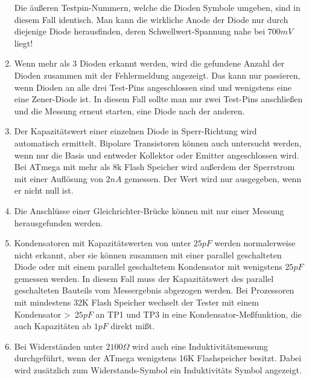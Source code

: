 \begin{enumerate}
Die äußeren Testpin-Nummern, welche die Dioden Symbole umgeben, sind in diesem Fall identisch.
Man kann die wirkliche Anode der Diode nur durch diejenige Diode herausfinden, deren Schwellwert-Spannung nahe bei \(700mV\) liegt!
\item Wenn mehr als 3 Dioden erkannt werden, wird die gefundene Anzahl der Dioden zusammen mit der Fehlermeldung angezeigt.
Das kann nur passieren, wenn Dioden an alle drei Test-Pins angeschlossen sind und wenigstens eine eine Zener-Diode ist.
In diesem Fall sollte man nur zwei Test-Pins anschließen und die Messung erneut starten, eine Diode nach der anderen.
\item Der Kapazitätswert einer einzelnen Diode in Sperr-Richtung wird automatisch ermittelt.
Bipolare Transistoren können auch untersucht werden, wenn nur die Basis und entweder Kollektor oder Emitter angeschlossen wird.
Bei ATmega mit mehr als 8k Flash Speicher wird außerdem der Sperrstrom mit einer Auflösung von \(2nA\) gemessen.
Der Wert wird nur ausgegeben, wenn er nicht null ist.
\item Die Anschlüsse einer Gleichrichter-Brücke können mit nur einer Messung herausgefunden werden.
\item Kondensatoren mit Kapazitätswerten von unter \(25pF\) werden normalerweise nicht erkannt, 
aber sie können zusammen mit einer parallel geschalteten Diode oder mit einem parallel geschaltetem Kondensator mit
wenigstens \(25pF\) gemessen werden.
In diesem Fall muss der Kapazitätswert des parallel geschalteten Bauteils vom Messergebnis abgezogen werden.
Bei Prozessoren mit mindestens 32K Flash Speicher wechselt der Tester mit einem Kondensator \textgreater~\(25pF\)
an TP1 und TP3 in eine Kondensator-Meßfunktion, die auch Kapazitäten ab \(1pF\) direkt mißt.
\item Bei Widerständen unter \(2100\Omega\) wird auch eine Induktivitätsmessung durchgeführt, wenn der
ATmega wenigstens 16K Flashspeicher besitzt.
Dabei wird zusätzlich zum Widerstands-Symbol \mbox{\electricR} ein Induktivitäts Symbol \mbox{\electricL} angezeigt.


\end{enumerate}
